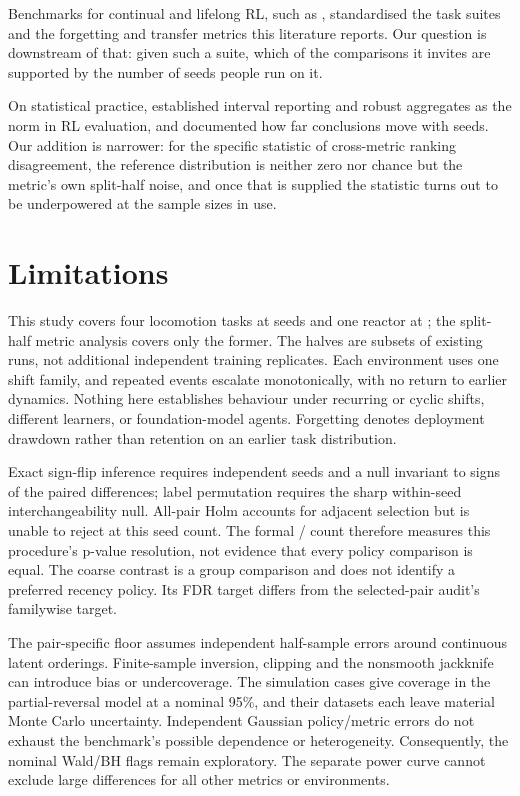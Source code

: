 \documentclass{article}
\begin{document}
Benchmarks for continual and lifelong RL, such as
\citet{wolczyk2021continualworld}, standardised the task suites and the
forgetting and transfer metrics this literature reports. Our question is
downstream of that: given such a suite, which of the comparisons it invites are
supported by the number of seeds people run on it.

On statistical practice, \citet{agarwal2021precipice} established interval
reporting and robust aggregates as the norm in RL evaluation, and
\citet{henderson2018matters} documented how far conclusions move with seeds. Our
addition is narrower: for the specific statistic of cross-metric ranking
disagreement, the reference distribution is neither zero nor chance but the
metric's own split-half noise, and once that is supplied the statistic turns out
to be underpowered at the sample sizes in use.

\section{Limitations}

This study covers four locomotion tasks at \SeedsHopper{} seeds and one reactor
at \SeedsPcgym{}; the split-half metric analysis covers only the former.
The halves are subsets of existing runs, not additional independent training
replicates. Each environment uses one shift family, and repeated events
escalate monotonically, with no return to earlier dynamics. Nothing here
establishes behaviour under recurring or cyclic shifts, different learners,
or foundation-model agents. Forgetting denotes deployment drawdown rather
than retention on an earlier task distribution.

Exact sign-flip inference requires independent seeds and a null invariant
to signs of the paired differences; label permutation requires the sharp
within-seed interchangeability null. All-pair Holm accounts for adjacent
selection but is unable to reject at this seed count. The formal
\AdjacentSeparated{}/\AdjacentTotal{} count therefore measures this
procedure's p-value resolution, not evidence that every policy comparison is
equal. The coarse contrast is a group comparison and does not identify a
preferred recency policy. Its FDR target differs from the selected-pair
audit's familywise target.

The pair-specific floor assumes independent half-sample errors around
continuous latent orderings. Finite-sample inversion, clipping and the
nonsmooth jackknife can introduce bias or undercoverage. The
\CalibrationCases{} simulation cases give \CalibrationCoverageReversal{}
coverage in the partial-reversal model at a nominal 95\%, and their
\CalibrationDatasets{} datasets each leave material Monte Carlo uncertainty.
Independent Gaussian policy/metric errors do not exhaust the benchmark's
possible dependence or heterogeneity. Consequently, the nominal Wald/BH
flags remain exploratory. The separate \PowerEnv{} power curve cannot
exclude large differences for all other metrics or environments.
\end{document}
